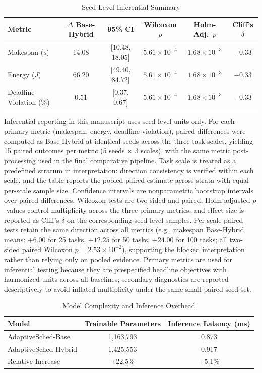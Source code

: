 \documentclass[journal]{IEEEtran}
\begin{document}
\begin{table}[t]
\centering
\caption{Seed-Level Inferential Summary}
\label{tab:inferential_summary}
\footnotesize
\begin{tabular*}{\textwidth}{@{\extracolsep{\fill}}lccccc@{}}
\toprule
\textbf{Metric} & \textbf{$\Delta$ Base-Hybrid} & \textbf{95\% CI} & \textbf{Wilcoxon $p$} & \textbf{Holm-Adj.\ $p$} & \textbf{Cliff's $\delta$} \\
\midrule
Makespan (\textit{s}) & 14.08 & [10.48, 18.05] & $5.61\times10^{-4}$ & $1.68\times10^{-3}$ & $-0.33$ \\
Energy (\textit{J}) & 66.20 & [49.40, 84.72] & $5.61\times10^{-4}$ & $1.68\times10^{-3}$ & $-0.33$ \\
Deadline Violation (\%) & 0.51 & [0.37, 0.67] & $5.61\times10^{-4}$ & $1.68\times10^{-3}$ & $-0.33$ \\
\bottomrule
\end{tabular*}
\end{table}
Inferential reporting in this manuscript uses seed-level units only. For each primary metric (makespan, energy, deadline violation), paired differences were computed as Base-Hybrid at identical seeds across the three task scales, yielding 15 paired outcomes per metric (5 seeds $\times$ 3 scales), with the same metric post-processing used in the final comparative pipeline. Task scale is treated as a predefined stratum in interpretation: direction consistency is verified within each scale, and the table reports the pooled paired estimate across strata with equal per-scale sample size. Confidence intervals are nonparametric bootstrap intervals over paired differences, Wilcoxon tests are two-sided and paired, Holm-adjusted $p$-values control multiplicity across the three primary metrics, and effect size is reported as Cliff's $\delta$ on the corresponding seed-level samples. Per-scale paired tests retain the same direction across all metrics (e.g., makespan Base-Hybrid means: $+6.00$ for 25 tasks, $+12.25$ for 50 tasks, $+24.00$ for 100 tasks; all two-sided paired Wilcoxon $p=2.53\times10^{-2}$), supporting the blocked interpretation rather than relying only on pooled evidence. Primary metrics are used for inferential testing because they are prespecified headline objectives with harmonized units across all baselines; secondary diagnostics are reported descriptively to avoid inflated multiplicity under the same small paired seed set.

\begin{table}[t]
\centering
\caption{Model Complexity and Inference Overhead}
\label{tab:overhead}
\footnotesize
\begin{tabular}{@{}lcc@{}}
\toprule
\textbf{Model} & \textbf{Trainable Parameters} & \textbf{Inference Latency (ms)} \\
\midrule
AdaptiveSched-Base & 1,163,793 & 0.873 \\
AdaptiveSched-Hybrid & 1,425,553 & 0.917 \\
\midrule
Relative Increase & +22.5\% & +5.1\% \\
\bottomrule
\end{tabular}
\end{table}
\end{document}
